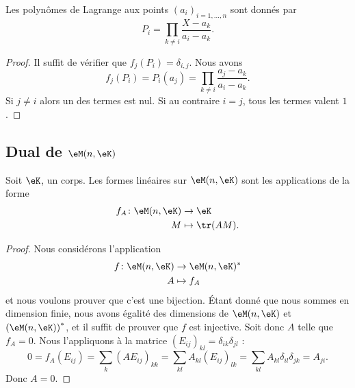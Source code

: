 \begin{proposition}
	Les polynômes de Lagrange aux points \( (a_i)_{i=1,\ldots, n}\) sont donnés par
	\begin{equation}
		P_i=\prod_{k\neq i}\frac{ X-a_k }{ a_i-a_k }.
	\end{equation}
\end{proposition}

\begin{proof}
	Il suffit de vérifier que \( f_j(P_i)=\delta_{i,j}\). Nous avons
	\begin{equation}
		f_j(P_i)=P_i(a_j)=\prod_{k\neq i}\frac{ a_j-a_k }{ a_i-a_k }.
	\end{equation}
	Si \( j\neq i\) alors un des termes est nul. Si au contraire \( i=j\), tous les termes valent \( 1\).
\end{proof}

\subsection{Dual de \texorpdfstring{\(  \eM(n,\eK)\)}{M(n,K)}}

\begin{proposition}     \label{PropHOjJpCa}
	Soit \( \eK\), un corps. Les formes linéaires sur \( \eM(n,\eK)\) sont les applications de la forme
	\begin{equation}
		\begin{aligned}
			f_A\colon \eM(n,\eK) & \to \eK          \\
			M                    & \mapsto \tr(AM).
		\end{aligned}
	\end{equation}
\end{proposition}


\begin{proof}
	Nous considérons l'application
	\begin{equation}
		\begin{aligned}
			f\colon \eM(n,\eK) & \to \eM(n,\eK)^* \\
			A                  & \mapsto f_A
		\end{aligned}
	\end{equation}
	et nous voulons prouver que c'est une bijection. Étant donné que nous sommes en dimension finie, nous avons égalité des dimensions de \( \eM(n,\eK)\) et \( \left(\eM(n,\eK)\right)^*\), et il suffit de prouver que \( f\) est injective. Soit donc \( A\) telle que \( f_A=0\). Nous l'appliquons à la matrice \( (E_{ij})_{kl}=\delta_{ik}\delta_{jl}\) :
	\begin{equation}
		0 = f_A(E_{ij})
		= \sum_{k}(AE_{ij})_{kk}
		= \sum_{kl}A_{kl}(E_{ij})_{lk}
		= \sum_{kl}A_{kl}\delta_{il}\delta_{jk}
		= A_{ji}.
	\end{equation}
	Donc \( A=0\).
\end{proof}

